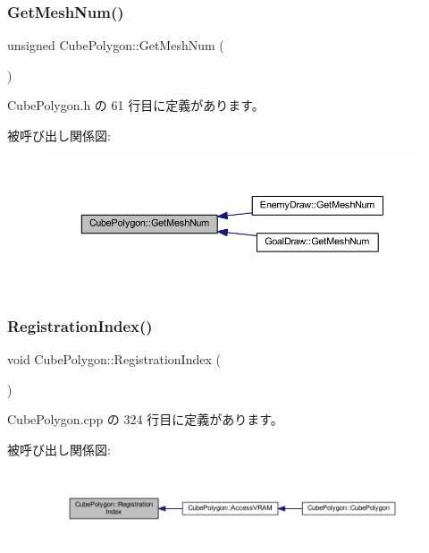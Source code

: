 \subsubsection{\texorpdfstring{Get\+Mesh\+Num()}{GetMeshNum()}}
{\footnotesize\ttfamily unsigned Cube\+Polygon\+::\+Get\+Mesh\+Num (\begin{DoxyParamCaption}{ }\end{DoxyParamCaption})\hspace{0.3cm}{\ttfamily [inline]}}



 Cube\+Polygon.\+h の 61 行目に定義があります。

被呼び出し関係図\+:\nopagebreak
\begin{figure}[H]
\begin{center}
\leavevmode
\includegraphics[width=350pt]{class_cube_polygon_adf0956096c0d5dd31cf5b730dc8ca9c4_icgraph}
\end{center}
\end{figure}
\mbox{\label{class_cube_polygon_a5a935712a3e3c1e12552aeedf2f409c1}} 
\subsubsection{\texorpdfstring{Registration\+Index()}{RegistrationIndex()}}
{\footnotesize\ttfamily void Cube\+Polygon\+::\+Registration\+Index (\begin{DoxyParamCaption}{ }\end{DoxyParamCaption})\hspace{0.3cm}{\ttfamily [private]}}



 Cube\+Polygon.\+cpp の 324 行目に定義があります。

被呼び出し関係図\+:\nopagebreak
\begin{figure}[H]
\begin{center}
\leavevmode
\includegraphics[width=350pt]{class_cube_polygon_a5a935712a3e3c1e12552aeedf2f409c1_icgraph}
\end{center}
\end{figure}
\mbox{\label{class_cube_polygon_adde345ed591e3e81abcffdcac5068f98}} 
